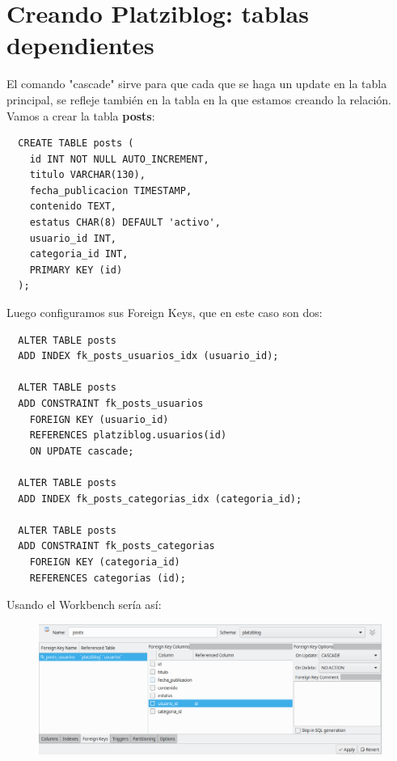 \documentclass{article}
\begin{document}
\section{Creando Platziblog: tablas dependientes}%
El comando "cascade" sirve para que cada que se haga un update en la tabla
principal, se refleje también en la tabla en la que estamos creando la
relación.\\

Vamos a crear la tabla \textbf{posts}:\\

\begin{verbatim}
  CREATE TABLE posts (
    id INT NOT NULL AUTO_INCREMENT,
    titulo VARCHAR(130),
    fecha_publicacion TIMESTAMP,
    contenido TEXT,
    estatus CHAR(8) DEFAULT 'activo',
    usuario_id INT,
    categoria_id INT,
    PRIMARY KEY (id)
  );
\end{verbatim}

\newpage

Luego configuramos sus Foreign Keys, que en este caso son dos:\\

\begin{verbatim}
  ALTER TABLE posts
  ADD INDEX fk_posts_usuarios_idx (usuario_id);

  ALTER TABLE posts
  ADD CONSTRAINT fk_posts_usuarios
    FOREIGN KEY (usuario_id)
    REFERENCES platziblog.usuarios(id)
    ON UPDATE cascade;

  ALTER TABLE posts
  ADD INDEX fk_posts_categorias_idx (categoria_id);

  ALTER TABLE posts
  ADD CONSTRAINT fk_posts_categorias
    FOREIGN KEY (categoria_id)
    REFERENCES categorias (id);
\end{verbatim}

Usando el Workbench sería así:\\

\begin{figure}[h!]
  \centering
  \includegraphics[scale=0.55]{./Pictures/068_fk.png}
\end{figure}
\end{document}
